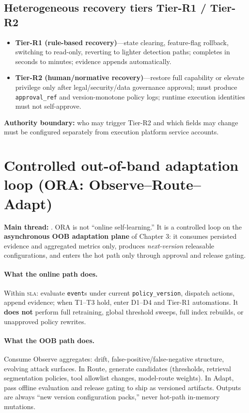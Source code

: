 \documentclass[11pt,a4paper]{report}
\begin{document}
\subsection{Heterogeneous recovery tiers Tier-R1 / Tier-R2}
\begin{itemize}
  \item \textbf{Tier-R1 (rule-based recovery)}—state clearing, feature-flag rollback, switching to read-only, reverting to lighter detection paths; completes in seconds to minutes; evidence appends automatically.
  \item \textbf{Tier-R2 (human/normative recovery)}—restore full capability or elevate privilege only after legal/security/data governance approval; must produce \texttt{approval\_ref} and version-monotone policy logs; runtime execution identities must not self-approve.
\end{itemize}
\textbf{Authority boundary:} who may trigger Tier-R2 and which fields may change must be configured separately from execution platform service accounts.

\section{Controlled out-of-band adaptation loop (ORA: Observe--Route--Adapt)}
\textbf{Main thread:} \ControlPlane{}. ORA is not “online self-learning.” It is a controlled loop on the \textbf{asynchronous OOB adaptation plane} of Chapter 3: it consumes persisted evidence and aggregated metrics only, produces \emph{next-version} releasable configurations, and enters the hot path only through approval and release gating.

\paragraph{What the online path does.} Within \textsc{sla}: evaluate \texttt{event}s under current \texttt{policy\_version}, dispatch actions, append evidence; when T1--T3 hold, enter D1--D4 and Tier-R1 automations. It \textbf{does not} perform full retraining, global threshold sweeps, full index rebuilds, or unapproved policy rewrites.

\paragraph{What the OOB path does.} Consume Observe aggregates: drift, false-positive/false-negative structure, evolving attack surfaces. In Route, generate candidates (thresholds, retrieval segmentation policies, tool allowlist changes, model-route weights). In Adapt, pass offline evaluation and release gating to ship as versioned artifacts. Outputs are always “new version configuration packs,” never hot-path in-memory mutations.
\end{document}
